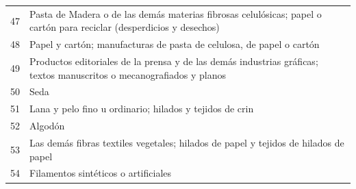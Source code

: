 \documentclass[a4paper,openright,12pt]{book}
\begin{document}
\begin{table}[]
{\begin{tabular}{@{}ll@{}}
47  & Pasta de Madera o de las demás materias fibrosas celulósicas; papel o cartón para reciclar (desperdicios y desechos)                                                                                                                                                                           \\
48  & Papel y cartón; manufacturas de pasta de celulosa, de papel o cartón                                                                                                                                                                                                                           \\
49  & Productos editoriales de la prensa y de las demás industrias gráficas; textos manuscritos o mecanografiados y planos                                                                                                                                                                           \\
50  & Seda                                                                                                                                                                                                                                                                                           \\
51  & Lana y pelo fino u ordinario; hilados y tejidos de crin                                                                                                                                                                                                                                        \\
52  & Algodón                                                                                                                                                                                                                                                                                        \\
53  & Las demás fibras textiles vegetales; hilados de papel y tejidos de hilados de papel                                                                                                                                                                                                            \\
54  & Filamentos sintéticos o artificiales                                                                                                                                                                                                                                                           \\

\end{tabular}}
\end{table}
\end{document}
